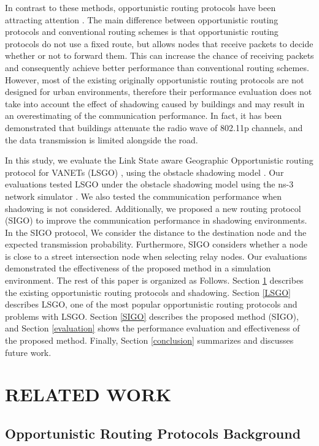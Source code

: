 \documentclass[conference]{IEEEtran}
\begin{document}
In contrast to these methods, opportunistic routing protocols have been attracting attention \cite{16}. The main difference between opportunistic routing protocols and conventional routing schemes is that opportunistic routing protocols do not use a fixed route, but allows nodes that receive packets to decide whether or not to forward them. 
This can increase the chance of receiving packets and consequently achieve better performance than conventional routing schemes.
However, most of the existing originally opportunistic routing protocols  are not designed for urban environments, therefore their performance evaluation does not take into account the effect of shadowing caused by buildings and may result in an overestimating of the communication performance. 
In fact, it has been demonstrated that buildings attenuate the radio wave of 802.11p channels, and the data transmission is limited alongside the road\cite{17}. 

In this study, we evaluate the Link State aware Geographic Opportunistic
routing protocol for VANETs (LSGO) \cite{18}, using the obstacle shadowing model \cite{20}. 
Our evaluations tested LSGO under the obstacle shadowing model \cite{20} using the ns-3 network simulator \cite{19}. 
We also tested the communication performance when shadowing is not considered.
Additionally, we proposed a new routing protocol (SIGO) to improve the communication performance in shadowing environments.
In the SIGO protocol, We consider the distance to the destination node and the expected transmission probability. Furthermore, SIGO considers whether a node is close to a street intersection node  when selecting relay nodes.
Our evaluations demonstrated the effectiveness of the proposed method in a simulation environment. The rest of this paper is organized as Follows.
Section \ref{relatedSection} describes the existing opportunistic routing protocols and shadowing. 
Section \ref{LSGO} describes LSGO, one of the most popular opportunistic routing protocols and problems with LSGO. 
Section \ref{SIGO} describes the proposed method (SIGO), and Section \ref{evaluation} shows the performance evaluation and effectiveness of the proposed method. Finally, Section \ref{conclusion} summarizes and discusses future work.

\section{RELATED WORK}
\label{relatedSection}

\subsection{Opportunistic Routing Protocols Background}
\end{document}
